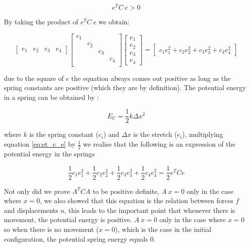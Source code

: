 \begin{equation}
\label{eq:et_c_e}
e^T C \ e > 0 
\end{equation}

By taking the product of $e^T C \ e$ we obtain:

\begin{equation*}
\begin{bmatrix}
e_1 & e_2 & e_3 & e_4
\end{bmatrix}
\begin{bmatrix}
c_1 &  &  &  \\
 & c_2 &  &  \\
 &  & c_3 &  \\
 &  &  & c_4 \\
\end{bmatrix}
\begin{bmatrix}
e_1 \\ e_2\\ e_3 \\ e_4
\end{bmatrix}
=
\begin{bmatrix}
c_1 e_1^2 + c_2 e_2^2 + c_3 e_3^2 + c_4 e_4^2
\end{bmatrix}
\end{equation*}

due to the square of $e$ the equation always comes out positive as long as the spring
constants are positive (which they are by definition). 
The potential energy in a spring can be obtained by
:

\begin{equation}
\label{eq:hooks_potential_energy}
E_U = \frac{1}{2} k \Delta x^2
\end{equation}

where $k$ is the spring constant ($c_i$) and $\Delta x$ is the stretch ($e_i$),
multiplying equation \eqref{eq:et_c_e} by $\frac{1}{2}$ we realise that
the following is an expression of the potential energy in the springs

\begin{equation}
\frac{1}{2}c_1 e_1^2 + \frac{1}{2}c_2 e_2^2 + \frac{1}{2}c_3 e_3^2 +
\frac{1}{2}c_4 e_4^2 =
\frac{1}{2}e^TCe 
\end{equation}

Not only did we prove $A^T C A$ to be positive
definite, $A \ x = 0$ only in the case where $x=0$, we also
showed that this equation is the relation between forces $f$ and
displacements $u$, this leads to the important point that whenever
there is movement, the potential energy is positive. 
%
$A \ x = 0$ only in the case where $x=0$ so when there is no movement
($x=0$), which is the case in the initial configuration, the potential
spring energy equals $0$.\\ 


